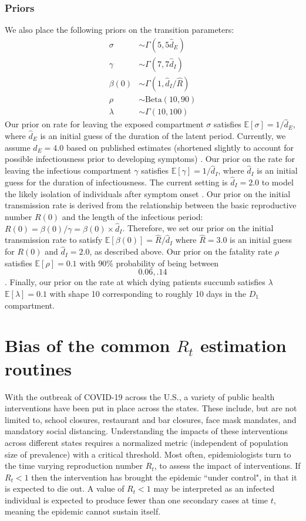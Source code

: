 \documentclass{umassthesis}          %
\newcommand{\Beta}{\text{Beta}}
\newcommand{\E}{\mathbb{E}}
\begin{document}
  \subsection{Priors}
We also place the following priors on the transition parameters: 
\begin{align*}
\sigma &\sim \Gamma(5, 5 \hat{d}_E)\\
\gamma & \sim \Gamma(7, 7 \hat{d}_I) \\
\beta(0) &\sim \Gamma(1, \hat{d}_I/\hat{R}) \\
    \rho &\sim \Beta(10, 90)\\ 
\lambda &\sim \Gamma(10, 100)
\end{align*}
 Our prior on rate for leaving the exposed compartment $\sigma$ satisfies $\E[\sigma] = 1/\hat{d}_E$, where $\hat{d}_E$ is an initial guess of the duration of the latent period. Currently, we assume $\hat{d}_E = 4.0$ based on published estimates (shortened slightly to account for possible infectiousness prior to developing symptoms) \cite{midas}.
 Our prior on the rate for leaving the infectious compartment $\gamma$ satisfies $\E[\gamma] = 1/\hat{d}_I$, where $\hat{d}_I$ is an initial guess for the duration of infectiousness. The current setting is $\hat{d}_I = 2.0$ to model the likely isolation of individuals after symptom onset \cite{heffner2020emotional}. 
Our prior on the initial transmission rate is derived from the relationship between the basic reproductive number $R(0)$ and the length of the infectious period: $R(0) = \beta(0)/\gamma = \beta(0)\times \hat{d}_I$. Therefore, we set our prior on the initial transmission rate to satisfy $\E[\beta(0)] = \hat{R}/\hat{d}_I$ where $\hat{R} = 3.0$ is an initial guess for $R(0)$ and $\hat{d}_I = 2.0$, as described above. 
Our prior on the fatality rate $\rho$ satisfies $\E[\rho] = 0.1$ with 90\% probability of being between \[0.06,.14\].
Finally, our prior on the rate at which dying patients succumb  satisfies $\lambda$ $\E[\lambda] = 0.1$ with shape 10 corresponding to roughly 10 days in the $D_{1}$ compartment.



\chapter{Bias of the common $R_t$ estimation routines}

With the outbreak of COVID-19 across the U.S., a variety of public health interventions have been put in place across the states. These include, but are not limited to, school closures, restaurant and bar closures, face mask mandates, and mandatory social distancing. Understanding the impacts of these interventions across different states requires a normalized metric (independent of population size of prevalence) with a critical threshold. Most often, epidemiologists turn to the time varying reproduction number $R_t$, to assess the impact of interventions. If $R_t <1$ then the intervention has brought the epidemic ``under control", in that it is expected to die out. A value of $R_t < 1$ may be interpreted as an infected individual is expected to produce fewer than one secondary cases at time $t$, meaning the epidemic cannot sustain itself. 
\end{document}

